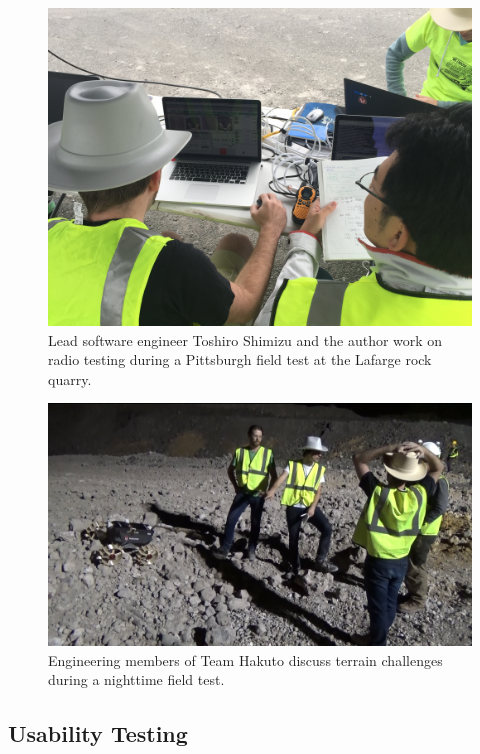 \begin{figure}[h]
\centering
    \includegraphics[width=\columnwidth]{images/daytime_operation_pittsburgh_field_test.jpg}
    \caption{Lead software engineer Toshiro Shimizu and the author work on radio testing during a Pittsburgh field test at the Lafarge rock quarry.}
    \label{fig:daytime_operation_pittsburgh_field_test}
\end{figure}

\begin{figure}[h]
\centering
    \includegraphics[width=\columnwidth]{images/night_test_team.png}
    \caption{Engineering members of Team Hakuto discuss terrain challenges during a nighttime field test.}
    \label{fig:night_test_team}
\end{figure}

\subsection{Usability Testing}

